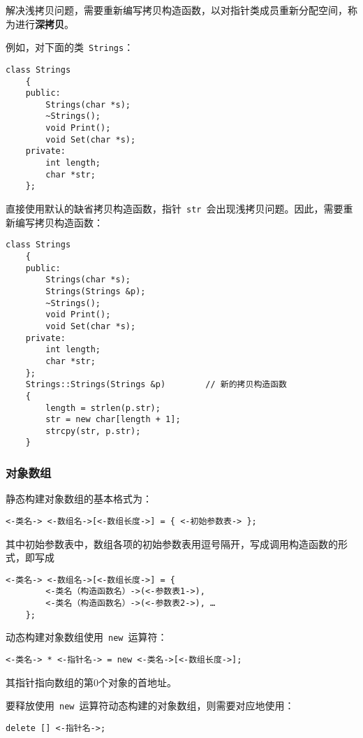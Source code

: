 \documentclass[10pt, a4paper, oneside, fontset=none]{ctexart}
\theoremstyle{plain}
\theoremstyle{definition}
\newcommand{\colors}[1]{\color{#1!75!black}}
\newcommand{\tboba}[1]{\textbf{\kai\color{bali!75!black}#1}}
\begin{document}
解决浅拷贝问题，需要重新编写拷贝构造函数，以对指针类成员重新分配空间，称为进行\tboba{深拷贝}。

例如，对下面的类~\lstinline[moreemph={Strings}, emphstyle=\colors{qinglv}, moreemph={[2]{length, str, s}}, emphstyle={[2]\it\ttfamily}, ]|Strings|：
\begin{lstlisting}[moreemph={Strings}, emphstyle=\colors{qinglv}, moreemph={[2]{length, str, s}}, emphstyle={[2]\it\ttfamily}, ]
	class Strings
	{
	public:
		Strings(char *s);
		~Strings();
		void Print();
		void Set(char *s);
	private:
		int length;
		char *str;
	};
\end{lstlisting}

\noindent 直接使用默认的缺省拷贝构造函数，指针~\lstinline[moreemph={Strings}, emphstyle=\colors{qinglv}, moreemph={[2]{length, str, s}}, emphstyle={[2]\it\ttfamily}, ]|str|~会出现浅拷贝问题。因此，需要重新编写拷贝构造函数：
\begin{lstlisting}[moreemph={Strings}, emphstyle=\colors{qinglv}, moreemph={[2]{length, str, s, p}}, emphstyle={[2]\it\ttfamily}, ]
	class Strings
	{
	public:
		Strings(char *s);
		Strings(Strings &p);
		~Strings();
		void Print();
		void Set(char *s);
	private:
		int length;
		char *str;
	};
	Strings::Strings(Strings &p)		// 新的拷贝构造函数
	{
		length = strlen(p.str);
		str = new char[length + 1];
		strcpy(str, p.str);
	}
\end{lstlisting}

\subsubsection{对象数组}
静态构建对象数组的基本格式为：
\begin{lstlisting}[style=intro]
	<-类名-> <-数组名->[<-数组长度->] = { <-初始参数表-> };
\end{lstlisting}
其中初始参数表中，数组各项的初始参数表用逗号隔开，写成调用构造函数的形式，即写成
\begin{lstlisting}[style=intro]
	<-类名-> <-数组名->[<-数组长度->] = {
		<-类名（构造函数名）->(<-参数表1->), 
		<-类名（构造函数名）->(<-参数表2->), … 
	};
\end{lstlisting}

动态构建对象数组使用~\lstinline|new|~运算符：
\begin{lstlisting}[style=intro]
	<-类名-> * <-指针名-> = new <-类名->[<-数组长度->];
\end{lstlisting}
其指针指向数组的第0个对象的首地址。

要释放使用~\lstinline|new|~运算符动态构建的对象数组，则需要对应地使用：
\begin{lstlisting}[style=intro]
	delete [] <-指针名->;
\end{lstlisting}
\end{document}

